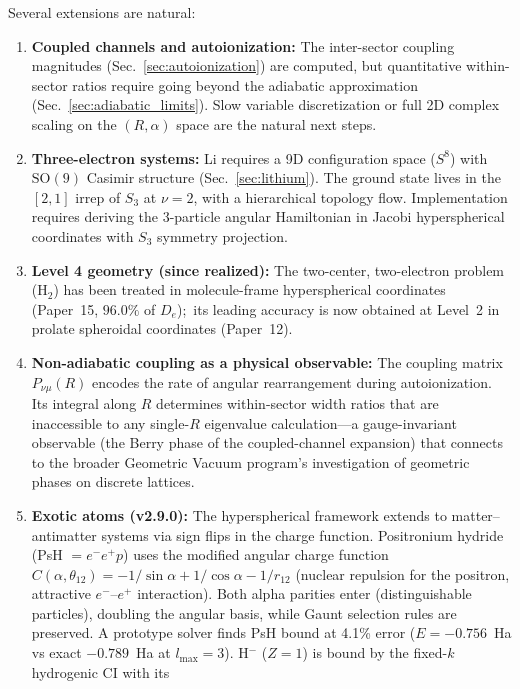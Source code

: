 \documentclass[aps,pra,twocolumn,superscriptaddress,longbibliography]{revtex4-2}
\begin{document}
Several extensions are natural:
\begin{enumerate}
  \item \textbf{Coupled channels and autoionization:} The
    inter-sector coupling magnitudes (Sec.~\ref{sec:autoionization})
    are computed, but quantitative within-sector
    ratios require going beyond the adiabatic approximation
    (Sec.~\ref{sec:adiabatic_limits}).  Slow variable discretization
    or full 2D complex scaling on the $(R, \alpha)$ space are the
    natural next steps.
  \item \textbf{Three-electron systems:} Li requires a 9D
    configuration space ($S^8$) with $\mathrm{SO}(9)$ Casimir
    structure (Sec.~\ref{sec:lithium}).  The ground state
    lives in the $[2,1]$ irrep of $S_3$ at $\nu = 2$, with a
    hierarchical topology flow.  Implementation requires deriving
    the 3-particle angular Hamiltonian in Jacobi hyperspherical
    coordinates with $S_3$ symmetry projection.
  \item \textbf{Level 4 geometry (since realized):} The two-center,
    two-electron problem (H$_2$) has been treated in molecule-frame
    hyperspherical coordinates (Paper~15, $96.0\%$ of $D_e$);\ its
    leading accuracy is now obtained at Level~2 in prolate spheroidal
    coordinates (Paper~12).
  \item \textbf{Non-adiabatic coupling as a physical observable:}
    The coupling matrix $P_{\nu\mu}(R)$ encodes the rate of angular
    rearrangement during autoionization.  Its integral along $R$
    determines within-sector width ratios that are inaccessible to
    any single-$R$ eigenvalue calculation---a gauge-invariant
    observable (the Berry phase of the coupled-channel expansion)
    that connects to the broader Geometric Vacuum program's
    investigation of geometric phases on discrete lattices.
  \item \textbf{Exotic atoms (v2.9.0):} The hyperspherical framework
    extends to matter--antimatter systems via sign flips in the charge
    function.  Positronium hydride (PsH $= e^- e^+ p$) uses the
    modified angular charge function
    $C(\alpha, \theta_{12}) = -1/\sin\alpha + 1/\cos\alpha - 1/r_{12}$
    (nuclear repulsion for the positron, attractive $e^-$--$e^+$
    interaction).  Both alpha parities enter (distinguishable particles),
    doubling the angular basis, while Gaunt selection rules are
    preserved.  A prototype solver finds PsH bound at 4.1\% error
    ($E = -0.756$~Ha vs exact $-0.789$~Ha at $l_{\max}=3$).
    H$^-$ ($Z=1$) is bound by the fixed-$k$ hydrogenic CI with its

\end{enumerate}
\end{document}
